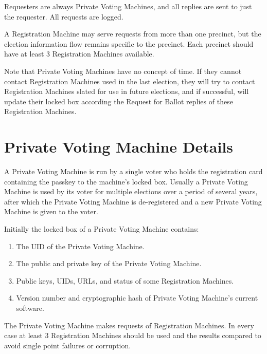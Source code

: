\documentclass[12pt]{article}
\begin{document}
Requesters are always Private Voting Machines, and all replies
are sent to just the requester.  All requests are logged.

A Registration Machine may serve requests from more than
one precinct, but the election information flow remains specific
to the precinct.  Each precinct should have at least 3
Registration Machines available.

Note that Private Voting Machines have no concept of time.
If they cannot contact Registration Machines used in the last
election, they will try to contact Registration Machines
slated for use in future elections, and if successful, will
update their locked box according the Request for Ballot
replies of these Registration Machines.

\section{Private Voting Machine Details}

A Private Voting Machine is run by a single voter
who holds the registration card containing the passkey to
the machine's locked box.  Usually a Private Voting Machine
is used by its voter for multiple elections over a period
of several years, after which the Private Voting Machine
is de-registered and a new Private Voting Machine
is given to the voter.

Initially the locked box of a Private Voting Machine contains:
\begin{enumerate}
\item The UID of the Private Voting Machine.
\item The public and private key of the Private Voting Machine.
\item Public keys, UIDs, URLs, and status of some Registration Machines.
\item Version number and cryptographic hash of Private Voting Machine's current
      software.
\setcounter{PVM-COUNTER}{\value{enumi}}
\end{enumerate}

The Private Voting Machine
makes requests of Registration Machines.  In every case
at least 3 Registration Machines should be used and the
results compared to avoid single point failures or corruption.
\end{document}
